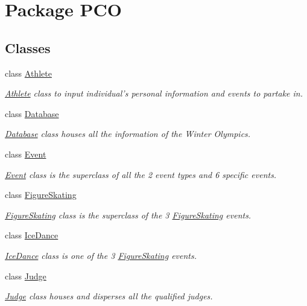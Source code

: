 \hypertarget{namespacePCO}{\section{Package P\+C\+O}
\label{namespacePCO}
}
\subsection*{Classes}
\begin{DoxyCompactItemize}
\item 
class \hyperlink{classPCO_1_1Athlete}{Athlete}
\begin{DoxyCompactList}\small\item\em \hyperlink{classPCO_1_1Athlete}{Athlete} class to input individual's personal information and events to partake in. \end{DoxyCompactList}\item 
class \hyperlink{classPCO_1_1Database}{Database}
\begin{DoxyCompactList}\small\item\em \hyperlink{classPCO_1_1Database}{Database} class houses all the information of the Winter Olympics. \end{DoxyCompactList}\item 
class \hyperlink{classPCO_1_1Event}{Event}
\begin{DoxyCompactList}\small\item\em \hyperlink{classPCO_1_1Event}{Event} class is the superclass of all the 2 event types and 6 specific events. \end{DoxyCompactList}\item 
class \hyperlink{classPCO_1_1FigureSkating}{Figure\+Skating}
\begin{DoxyCompactList}\small\item\em \hyperlink{classPCO_1_1FigureSkating}{Figure\+Skating} class is the superclass of the 3 \hyperlink{classPCO_1_1FigureSkating}{Figure\+Skating} events. \end{DoxyCompactList}\item 
class \hyperlink{classPCO_1_1IceDance}{Ice\+Dance}
\begin{DoxyCompactList}\small\item\em \hyperlink{classPCO_1_1IceDance}{Ice\+Dance} class is one of the 3 \hyperlink{classPCO_1_1FigureSkating}{Figure\+Skating} events. \end{DoxyCompactList}\item 
class \hyperlink{classPCO_1_1Judge}{Judge}
\begin{DoxyCompactList}\small\item\em \hyperlink{classPCO_1_1Judge}{Judge} class houses and disperses all the qualified judges. \end{DoxyCompactList}\item 

\end{DoxyCompactItemize}
